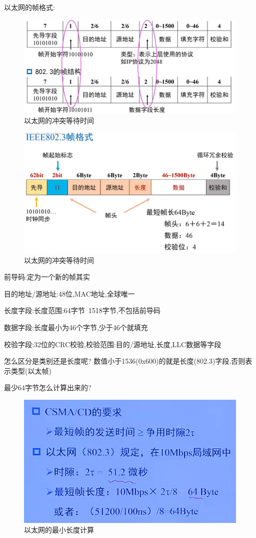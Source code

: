 \documentclass[UTF8,a4paper]{ctexart}
\begin{document}
以太网的帧格式:
\begin{figure}[H]
  \centering
  \includegraphics{assets/jisuanjiwangluo_ce52c.png}
  \caption{以太网的冲突等待时间}
\end{figure}
\begin{figure}[H]
  \centering
  \includegraphics{assets/jisuanjiwangluo_2069e.png}
  \caption{以太网的冲突等待时间}
\end{figure}

前导码:定为一个新的帧其实

目的地址/源地址:48位,MAC地址,全球唯一

长度字段:长度范围:64字节~1518字节,不包括前导码

数据字段:长度最小为46个字节,少于46个就填充

校验字段:32位的CRC校验,校验范围:目的/源地址,长度,LLC数据等字段

怎么区分是类别还是长度呢?
数值小于1536(0x600)的就是长度(802.3)字段,否则表示类型(以太帧)

最少64字节怎么计算出来的?
\begin{figure}[H]
  \centering
  \includegraphics{assets/jisuanjiwangluo_149b5.png}
  \caption{以太网的最小长度计算}
\end{figure}
\end{document}
